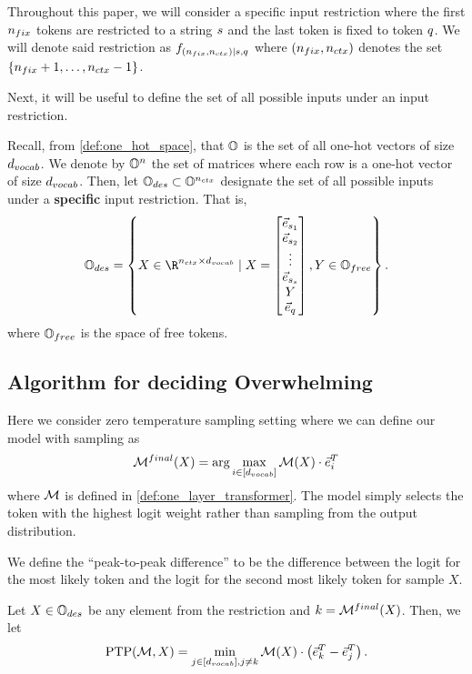 Throughout this paper, we will consider a specific input restriction where the first $n_{fix}$ tokens are restricted to a string ${s}$ and the last token is fixed to token $q$.
We will denote said restriction as $f_{(n_{fix}, {n_{ctx}}) \mid {s}, q}$ where $(n_{fix}, {n_{ctx}})$ denotes the set $\{ n_{fix} + 1, \ldots, {n_{ctx}} - 1\}$.

Next, it will be useful to define the set of all possible inputs under an input restriction.

\begin{definition}
	\label{def:InpSpace}
	Recall, from \cref{def:one_hot_space}, that $\mathbb{O}$ is the set of all one-hot vectors of size ${d_{vocab}}$.
	We denote by $\mathbb{O}^n$ the set of matrices where each row is a one-hot vector of size ${d_{vocab}}$.
	Then, let $\mathbb{O}_{des} \subset \mathbb{O}^{n_{ctx}}$ designate the set of all possible inputs under a \textbf{specific} input restriction.
	That is, 
	\[
		\InpSpace = \left\{ X \in \R^{\nctx \times \dVocab} \mid X = 
		\begin{bmatrix}
			\vece_{\desSet_1} \\
			\vece_{\desSet_2} \\
			\vdots \\
			\vece_{\desSet_s} \\
			Y \\
			\vecQuery
		\end{bmatrix}, Y \in \freeSpace
		\right\}.
	\]
	where $\mathbb{O}_{free}$ is the space of free tokens.
\end{definition}
\subsection{Algorithm for deciding Overwhelming}
Here we consider zero temperature sampling setting where we can define our model with sampling as
\[
	\mathcal{M}^{final}(X) = \arg\max_{i \in [{d_{vocab}}]} \mathcal{M}(X) \cdot \vec{e}_i^T
\]
where $\mathcal{M}$ is defined in \cref{def:one_layer_transformer}.
The model simply selects the token with the highest logit weight rather than sampling from the output distribution. 

We define the ``peak-to-peak difference'' to be the difference between the logit for the most likely token and the logit for the second most likely token for sample $X$.

\begin{definition}
    Let $X \in \mathbb{O}_{des}$ be any element from the restriction and $k = \mathcal{M}^{final}(X)$.
    Then, we let 
    \[
    	\mathrm{PTP}(\mathcal{M}, X) = \min_{j \in [{d_{vocab}}], j \neq k} \mathcal{M}(X) \cdot \left(\vec{e}_{k}^T - \vec{e}_j^T\right).
    \]
\end{definition}

